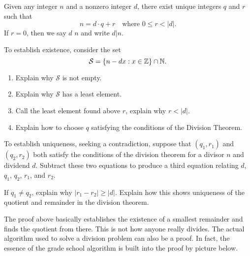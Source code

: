 \documentclass{ximera}
\begin{document}
\begin{theorem}\label{T:DT}
  Given any integer $n$ and a nonzero integer $d$, there exist unique
  integers $q$ and $r$ such that
  \[
  n = d\cdot q+r\quad\text{where $0\le r< |d|$.}
  \]
  If $r=0$, then we say $d$  $n$ and write $d|n$.
  \begin{sketch}
    To establish existence, consider the set
    \[
    \mathcal{S} = \{n -  dx : x\in \mathbb Z\}\cap \mathbb N.
    \]
    \begin{enumerate}
    \item Explain why $\mathcal S$ is not empty.
    \item Explain why $\mathcal S$ has a least element.
    \item Call the least element found above $r$, explain why $r < |d|$.
    \item Explain how to choose $q$ satisfying the conditions of the
      Division Theorem.
    \end{enumerate}
    
    To establish uniqueness, seeking a contradiction, suppose that
    $(q_1,r_1)$ and $(q_2,r_2)$ both satisfy the conditions of the
    division theorem for a divisor $n$ and dividend $d$. Subtract
    these two equations to produce a third equation relating $d$,
    $q_1$, $q_2$, $r_1$, and $r_2$.


    If $q_1 \ne q_2$, explain why $|r_1 - r_2| \ge |d|$.  Explain how
    this shows uniqueness of the quotient and remainder in the
    division theorem.
  \end{sketch}
\end{theorem}


The proof above basically establishes the existence of a smallest
remainder and finds the quotient from there. This is not how anyone
really divides.  The actual algorithm used to solve a division problem
can also be a proof. In fact, the essence of the grade school
algorithm is built into the proof by picture below.
\end{document}
